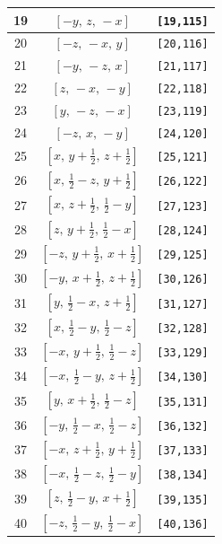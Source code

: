 \documentclass[fleqn,8pt]{jsarticle}
\begin{document}
\begin{longtable}{ccc}
19 & $\left[ - y,\, z,\, - x \right]$ & {\tt [19,115]} \\ \hline
20 & $\left[ - z,\, - x,\, y \right]$ & {\tt [20,116]} \\ \hline
21 & $\left[ - y,\, - z,\, x \right]$ & {\tt [21,117]} \\ \hline
22 & $\left[ z,\, - x,\, - y \right]$ & {\tt [22,118]} \\ \hline
23 & $\left[ y,\, - z,\, - x \right]$ & {\tt [23,119]} \\ \hline
24 & $\left[ - z,\, x,\, - y \right]$ & {\tt [24,120]} \\ \hline
25 & $\left[ x,\, y + \frac{1}{2},\, z + \frac{1}{2} \right]$ & {\tt [25,121]} \\ \hline
26 & $\left[ x,\, \frac{1}{2} - z,\, y + \frac{1}{2} \right]$ & {\tt [26,122]} \\ \hline
27 & $\left[ x,\, z + \frac{1}{2},\, \frac{1}{2} - y \right]$ & {\tt [27,123]} \\ \hline
28 & $\left[ z,\, y + \frac{1}{2},\, \frac{1}{2} - x \right]$ & {\tt [28,124]} \\ \hline
29 & $\left[ - z,\, y + \frac{1}{2},\, x + \frac{1}{2} \right]$ & {\tt [29,125]} \\ \hline
30 & $\left[ - y,\, x + \frac{1}{2},\, z + \frac{1}{2} \right]$ & {\tt [30,126]} \\ \hline
31 & $\left[ y,\, \frac{1}{2} - x,\, z + \frac{1}{2} \right]$ & {\tt [31,127]} \\ \hline
32 & $\left[ x,\, \frac{1}{2} - y,\, \frac{1}{2} - z \right]$ & {\tt [32,128]} \\ \hline
33 & $\left[ - x,\, y + \frac{1}{2},\, \frac{1}{2} - z \right]$ & {\tt [33,129]} \\ \hline
34 & $\left[ - x,\, \frac{1}{2} - y,\, z + \frac{1}{2} \right]$ & {\tt [34,130]} \\ \hline
35 & $\left[ y,\, x + \frac{1}{2},\, \frac{1}{2} - z \right]$ & {\tt [35,131]} \\ \hline
36 & $\left[ - y,\, \frac{1}{2} - x,\, \frac{1}{2} - z \right]$ & {\tt [36,132]} \\ \hline
37 & $\left[ - x,\, z + \frac{1}{2},\, y + \frac{1}{2} \right]$ & {\tt [37,133]} \\ \hline
38 & $\left[ - x,\, \frac{1}{2} - z,\, \frac{1}{2} - y \right]$ & {\tt [38,134]} \\ \hline
39 & $\left[ z,\, \frac{1}{2} - y,\, x + \frac{1}{2} \right]$ & {\tt [39,135]} \\ \hline
40 & $\left[ - z,\, \frac{1}{2} - y,\, \frac{1}{2} - x \right]$ & {\tt [40,136]} \\ \hline

\end{longtable}
\end{document}
